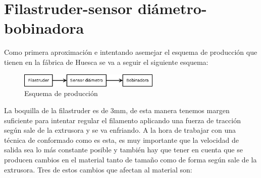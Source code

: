 \section{Filastruder-sensor diámetro-bobinadora}
\label{sec:FSB}

Como primera aproximación e intentando asemejar el esquema de producción que tienen en la fábrica de Huesca se va a seguir el siguiente esquema:

\begin{figure}[H]
    \centering
    \includegraphics[width=0.6\textwidth]{images/producciones/Diagram1.png}
    \caption{Esquema de producción}
    \label{fig:esquemap_FSB}
\end{figure}

La boquilla de la filastruder es de 3mm, de esta manera tenemos margen suficiente para intentar regular el filamento aplicando una fuerza de tracción según sale de la extrusora y se va enfriando. A la hora de trabajar con una técnica de conformado como es esta, es muy importante que la velocidad de salida sea lo más constante posible y también hay que tener en cuenta que se producen cambios en el material tanto de tamaño como de forma según sale de la extrusora. Tres de estos cambios que afectan al material son: \cite{tecno_polimeros}

